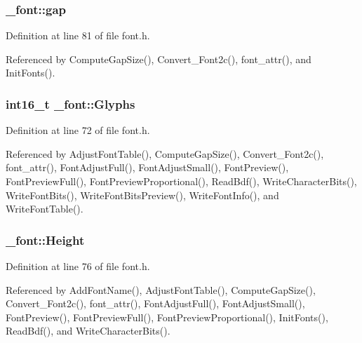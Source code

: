 \hypertarget{struct__font_af4d840b8e62f6a0548cef0a5474416f4}{
\subsubsection[{gap}]{ \-\_\-font\-::gap}}\label{struct__font_af4d840b8e62f6a0548cef0a5474416f4}


Definition at line 81 of file font.\-h.



Referenced by Compute\-Gap\-Size(), Convert\-\_\-\-Font2c(), font\-\_\-attr(), and Init\-Fonts().

\hypertarget{struct__font_a1e89c06fc11a730eb602522dc8953491}{
\subsubsection[{Glyphs}]{\setlength{\rightskip}{0pt plus 5cm}int16\-\_\-t \-\_\-font\-::\-Glyphs}}\label{struct__font_a1e89c06fc11a730eb602522dc8953491}


Definition at line 72 of file font.\-h.



Referenced by Adjust\-Font\-Table(), Compute\-Gap\-Size(), Convert\-\_\-\-Font2c(), font\-\_\-attr(), Font\-Adjust\-Full(), Font\-Adjust\-Small(), Font\-Preview(), Font\-Preview\-Full(), Font\-Preview\-Proportional(), Read\-Bdf(), Write\-Character\-Bits(), Write\-Font\-Bits(), Write\-Font\-Bits\-Preview(), Write\-Font\-Info(), and Write\-Font\-Table().

\hypertarget{struct__font_a5888921d1a78bf917351a275e2033467}{
\subsubsection[{Height}]{ \-\_\-font\-::\-Height}}\label{struct__font_a5888921d1a78bf917351a275e2033467}


Definition at line 76 of file font.\-h.



Referenced by Add\-Font\-Name(), Adjust\-Font\-Table(), Compute\-Gap\-Size(), Convert\-\_\-\-Font2c(), font\-\_\-attr(), Font\-Adjust\-Full(), Font\-Adjust\-Small(), Font\-Preview(), Font\-Preview\-Full(), Font\-Preview\-Proportional(), Init\-Fonts(), Read\-Bdf(), and Write\-Character\-Bits().

